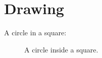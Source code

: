 \documentclass{article}
\begin{document}
\section{Drawing}
A circle in a square:
\begin{figure}[h]
\centering
{}
\caption{A circle inside a square.}
\end{figure}
\end{document}
